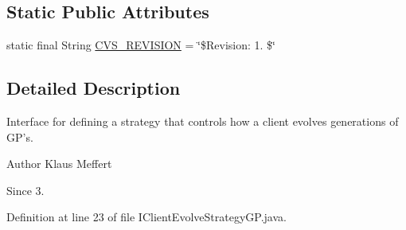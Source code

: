 \subsection*{Static Public Attributes}
\begin{DoxyCompactItemize}
\item 
static final String \hyperlink{interfaceorg_1_1jgap_1_1distr_1_1grid_1_1gp_1_1_i_client_evolve_strategy_g_p_a271010fbb695b7ab5d30768c248edd36}{C\-V\-S\-\_\-\-R\-E\-V\-I\-S\-I\-O\-N} = \char`\"{}\$Revision\-: 1. \$\char`\"{}
\end{DoxyCompactItemize}


\subsection{Detailed Description}
Interface for defining a strategy that controls how a client evolves generations of G\-P's.

\begin{DoxyAuthor}{Author}
Klaus Meffert 
\end{DoxyAuthor}
\begin{DoxySince}{Since}
3. 
\end{DoxySince}


Definition at line 23 of file I\-Client\-Evolve\-Strategy\-G\-P.\-java.



